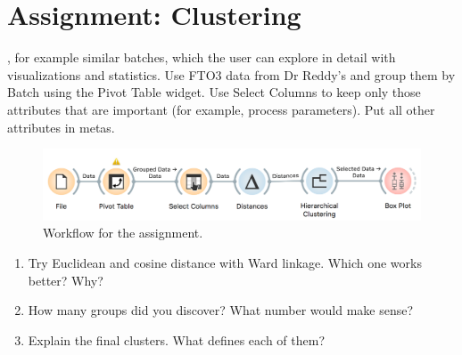 \chapter{Assignment: Clustering}
\label{hw:clustering}

, for example similar batches, which the user can explore in detail with visualizations and statistics. Use FTO3 data from Dr Reddy’s and group them by Batch using the Pivot Table widget. Use Select Columns to keep only those attributes that are important (for example, process parameters). Put all other attributes in metas.

\begin{figure}[h]
  \centering
  \includegraphics[width=\linewidth]{clustering.png}%
  \caption{Workflow for the assignment.}
  \label{fig:clustering}
\end{figure}

\begin{enumerate}
    \item Try Euclidean and cosine distance with Ward linkage. Which one works better? Why?
    \item How many groups did you discover? What number would make sense?
    \item Explain the final clusters. What defines each of them?
\end{enumerate}
